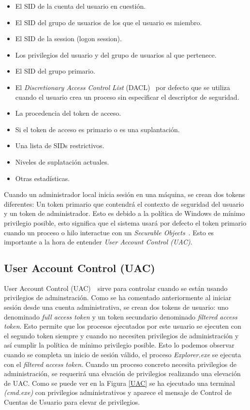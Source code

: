 \begin{itemize}
\item El SID de la cuenta del usuario en cuestión.
\item El SID del grupo de usuarios de los que el usuario es miembro.
\item El SID de la session (logon session).
\item Los privilegios del usuario y del grupo de usuarios al que pertenece.
\item El SID del grupo primario. 
\item El {\it Discretionary Access Control List} (DACL)~\cite{Capitulo2:DACL} por defecto que se utiliza cuando el usuario crea un proceso sin especificar el descriptor de seguridad.
\item La procedencia del token de acceso.
\item Si el token de acceso es primario o es una suplantación. 
\item Una lista de SIDs restrictivos.
\item Niveles de suplatación actuales.
\item Otras estadísticas. 
\end{itemize}

Cuando un administrador local inicia sesión en una máquina, se crean dos tokens diferentes: Un token primario que contendrá el contexto de seguridad del usuario y un token de administrador. Esto es debido a la política de Windows de mínimo privilegio posible, esto significa que el sistema usará por defecto el token primario cuando un proceso o hilo interactue con un {\it Securable Objects}~\cite{Capitulo2:Securable-Objects}. Esto es importante a la hora de entender {\it User Account Control (UAC)}.\\

\subsection{User Account Control (UAC)}

User Account Control (UAC)~\cite{Capitulo2:UAC}~\cite{Capitulo2:UAC2}sirve para controlar cuando se están usando privilegios de adminstración. Como se ha comentado anteriormente al iniciar sesión desde una cuenta administrativa, se crean dos tokens de usuario: uno denominado {\it full access token} y un token secundario denominado {\it filtered access token}. Esto permite que los procesos ejecutados por este usuario se ejecuten con el segundo token siempre y cuando no necesiten privilegios de administración y así cumplir la política de mínimo privilegio posible. Esto lo podemos observar cuando se completa un inicio de sesión válido, el proceso {\it Explorer.exe} se ejecuta con el {\it filtered access token}. Cuando un proceso concreto necesita privilegios de administración, se requerirá una elvación de privilegios realizando una elevación de UAC. Como se puede ver en la Figura \ref{UAC} se ha ejecutado una terminal {\it (cmd.exe)} con privilegios administrativos y aparece el mensaje de Control de Cuentas de Usuario para elevar de privilegios. \\

